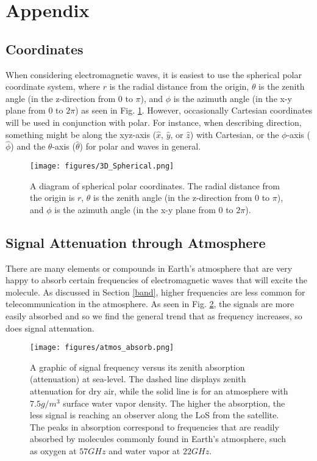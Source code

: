 \documentclass[10pt]{article}
\begin{document}
\newpage
\appendix

\section{Appendix}

\subsection{Coordinates}
\label{appen_coord}

When considering electromagnetic waves, it is easiest to use the spherical polar coordinate system, where $r$ is the radial distance from the origin, $\theta$ is the zenith angle (in the z-direction from $0$ to $\pi$), and $\phi$ is the azimuth angle (in the x-y plane from $0$ to $2\pi$) as seen in Fig. \ref{fig:sphere_polar_coord}. However, occasionally Cartesian coordinates will be used in conjunction with polar. For instance, when describing direction, something might be along the xyz-axis ($\hat{x}$, $\hat{y}$, or $\hat{z}$) with Cartesian, or the $\phi$-axis ($\hat{\phi}$) and the $\theta$-axis ($\hat{\theta}$) for polar and waves in general.

\begin{figure}[h!]
\centering
\texttt{[image: figures/3D\_Spherical.png]}
\caption{A diagram of spherical polar coordinates. The radial distance from the origin is $r$, $\theta$ is the zenith angle (in the z-direction from 0 to $\pi$), and $\phi$ is the azimuth angle (in the x-y plane from 0 to $2\pi$).}
\label{fig:sphere_polar_coord}
\end{figure}


\subsection{Signal Attenuation through Atmosphere}
\label{appen_atmos_atten}

There are many elements or compounds in Earth's atmosphere that are very happy to absorb certain frequencies of electromagnetic waves that will excite the molecule. As discussed in Section \ref{band}, higher frequencies are less common for telecommunication in the atmosphere. As seen in Fig. \ref{fig:atmos_atten}, the signals are more easily absorbed and so we find the general trend that as frequency increases, so does signal attenuation.

\begin{figure}[h!]
\centering
\texttt{[image: figures/atmos\_absorb.png]}
\caption{A graphic of signal frequency versus its zenith absorption (attenuation) at sea-level. The dashed line displays zenith attenuation for dry air, while the solid line is for an atmosphere with $7.5\si{g/m^3}$ surface water vapor density. The higher the absorption, the less signal is reaching an observer along the LoS from the satellite. The peaks in absorption correspond to frequencies that are readily absorbed by molecules commonly found in Earth's atmosphere, such as oxygen at $57\si{GHz}$ and water vapor at $22\si{GHz}$\cite{atmos_atten}\cite{richharia_westbrook_2010}.}
\label{fig:atmos_atten}
\end{figure}
\end{document}
